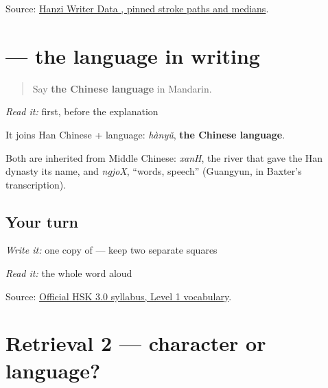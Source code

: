 \begin{tcolorbox}[breakable,colback=teal!4,colframe=teal!35!black,title={Before you move on}]
Source: \href{https://raw.githubusercontent.com/chanind/hanzi-writer-data/68d10a4b21150cae5e1ebbd223eed289cf32d90c/data/\%E8\%AF\%AD.json}{Hanzi Writer Data , pinned stroke paths and medians}.
\end{tcolorbox}
\section[\texorpdfstring{\zh{汉语} (hànyǔ)}{汉语 (hànyǔ)}]{ — the language in writing}

\label{lesson:ZH-C16-hanyu}



\begin{quote}
Say \textbf{the Chinese language} in Mandarin.
\end{quote}

\begin{cousinweb}
\emph{Read it:} \textbf{} first, before the explanation

\begin{quote}
\textbf{}
\end{quote}

It joins Han Chinese + language: \emph{hànyǔ}, \textbf{the Chinese language}.

Both are inherited from Middle Chinese: \emph{xanH}, the river that gave the Han dynasty its name, and \emph{ngjoX}, \textquotedblleft{}words, speech\textquotedblright{} (Guangyun, in Baxter's transcription).
\end{cousinweb}

\subsection*{Your turn}
\emph{Write it:} one copy of \textbf{} — keep two separate squares

\emph{Read it:} the whole word aloud

\begin{tcolorbox}[breakable,colback=teal!4,colframe=teal!35!black,title={Before you move on}]
Source: \href{https://hsk.cn-bj.ufileos.com/3.0/\%E6\%96\%B0\%E7\%89\%88HSK\%E8\%80\%83\%E8\%AF\%95\%E5\%A4\%A7\%E7\%BA\%B21219.pdf}{Official HSK 3.0 syllabus, Level 1 vocabulary}.
\end{tcolorbox}
\section[Practice]{Retrieval 2 — character or language?}

